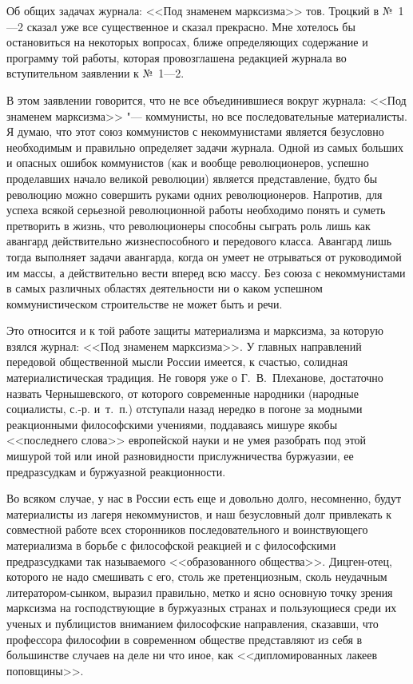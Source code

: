Об общих задачах журнала: <<Под знаменем марксизма>> тов. Троцкий в №~1---2
сказал уже все существенное и сказал прекрасно. Мне хотелось бы
остановиться на некоторых вопросах, ближе определяющих содержание и
программу той работы, которая провозглашена редакцией журнала во
вступительном заявлении к №~1---2.

В этом заявлении говорится, что не все объединившиеся вокруг журнала: <<Под
знаменем марксизма>> "--- коммунисты, но все последовательные материалисты. Я
думаю, что этот союз коммунистов с некоммунистами является безусловно
необходимым и правильно определяет задачи журнала. Одной из самых больших и
опасных ошибок коммунистов (как и вообще революционеров, успешно
проделавших начало великой революции) является представление, будто бы
революцию можно совершить руками одних революционеров. Напротив, для успеха
всякой серьезной революционной работы необходимо понять и суметь претворить
в жизнь, что революционеры способны сыграть роль лишь как авангард
действительно жизнеспособного и передового класса. Авангард лишь тогда
выполняет задачи авангарда, когда он умеет не отрываться от руководимой им
массы, а действительно вести вперед всю массу. Без союза с некоммунистами в
самых различных областях деятельности ни о каком успешном коммунистическом
строительстве не может быть и речи.

Это относится и к той работе защиты материализма и марксизма, за которую
взялся журнал: <<Под знаменем марксизма>>. У главных направлений передовой
общественной мысли России имеется, к счастью, солидная материалистическая
традиция. Не говоря уже о Г.~В.~Плеханове, достаточно назвать
Чернышевского, от которого современные народники (народные социалисты,
с.-р. и~т.~п.) отступали назад нередко в погоне за модными реакционными
философскими учениями, поддаваясь мишуре якобы <<последнего слова>>
европейской науки и не умея разобрать под этой мишурой той или иной
разновидности прислужничества буржуазии, ее предразсудкам и буржуазной
реакционности.

Во всяком случае, у нас в России есть еще и довольно долго, несомненно,
будут материалисты из лагеря некоммунистов, и наш безусловный долг
привлекать к совместной работе всех сторонников последовательного и
воинствующего материализма в борьбе с философской реакцией и с философскими
предразсудками так называемого <<образованного общества>>. Дицген-отец,
которого не надо смешивать с его, столь же претенциозным, сколь неудачным
литератором-сынком, выразил правильно, метко и ясно основную точку зрения
марксизма на господствующие в буржуазных странах и пользующиеся среди их
ученых и публицистов вниманием философские направления, сказавши, что
профессора философии в современном обществе представляют из себя в
большинстве случаев на деле ни что иное, как <<дипломированных лакеев
поповщины>>.

